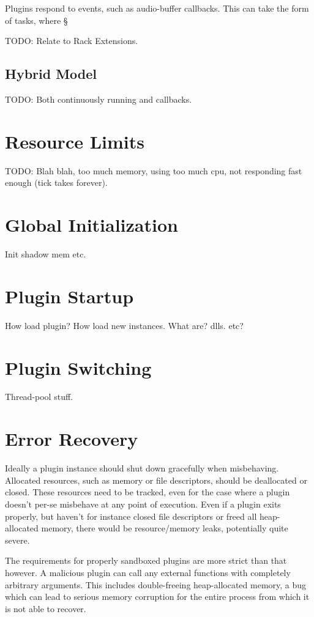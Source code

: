 Plugins respond to events, such as audio-buffer callbacks. This can take the
form of tasks, where §

TODO: Relate to Rack Extensions.

\subsection {Hybrid Model}

TODO: Both continuously running and callbacks.


\section {Resource Limits}

TODO: Blah blah, too much memory, using too much cpu, not responding fast enough
(tick takes forever).


\section {Global Initialization}

Init shadow mem etc.


\section {Plugin Startup}

How load plugin? How load new instances. What are? dlls. etc?


\section {Plugin Switching}

Thread-pool stuff.


\section {Error Recovery}

Ideally a plugin instance should shut down gracefully when misbehaving.
Allocated resources, such as memory or file descriptors, should be deallocated
or closed.
These resources need to be tracked, even for the case where a plugin doesn't
per-se misbehave at any point of execution.
Even if a plugin exits properly, but haven't for instance closed file
descriptors or freed all heap-allocated memory, there would be resource/memory
leaks, potentially quite severe.

The requirements for properly sandboxed plugins are more strict than that
however.
A malicious plugin can call any external functions with completely arbitrary
arguments. This includes double-freeing heap-allocated memory, a bug which can
lead to serious memory corruption for the entire process from which it is not
able to recover.

